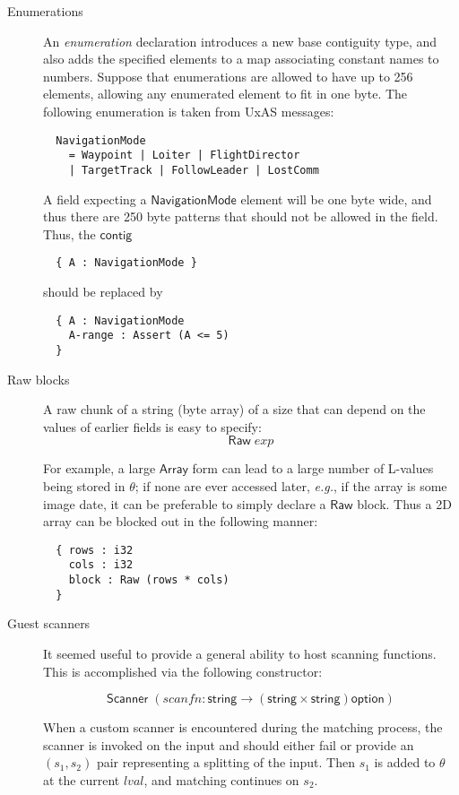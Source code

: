 \documentclass[a4paper,UKenglish,cleveref, autoref, thm-restate]{lipics-v2021}
\newcommand{\eg}{\textit{e.g.}}
\newcommand{\konst}[1]{\ensuremath{\mathsf{#1}}}
\newcommand{\lval}{\ensuremath{\mathit{lval}}}
\begin{document}
\begin{description}

\item [Enumerations] An \emph{enumeration} declaration
introduces a new base contiguity type, and also adds the specified
elements to a map associating constant names to numbers.
Suppose that enumerations are allowed to have up to 256 elements,
allowing any enumerated element to fit in one byte. The following
enumeration is taken from UxAS messages:
{\small
\begin{verbatim}
  NavigationMode
    = Waypoint | Loiter | FlightDirector
    | TargetTrack | FollowLeader | LostComm
\end{verbatim}
}
A field expecting a \konst{NavigationMode} element will be one byte wide,
and thus there are 250 byte patterns that should not be allowed in the
field. Thus, the \konst{contig}

{\small\begin{verbatim}
  { A : NavigationMode }
\end{verbatim}
}
should be replaced by

{\small
\begin{verbatim}
  { A : NavigationMode
    A-range : Assert (A <= 5)
  }
\end{verbatim}
}

\item [Raw blocks] A raw chunk of a string (byte array) of a size that
  can depend on the values of earlier fields is easy to specify:
  \[ \konst{Raw}\; \mathit{exp} \]

For example, a large \konst{Array} form can lead to a large number of
L-values being stored in $\theta$; if none are ever accessed later,
\eg, if the array is some image date, it can be preferable to simply
declare a \konst{Raw} block. Thus a 2D array can be blocked out in the
following manner:

{\small
\begin{verbatim}
  { rows : i32
    cols : i32
    block : Raw (rows * cols)
  }
\end{verbatim}
}

\item [Guest scanners] It seemed useful to provide a general ability
  to host scanning functions. This is accomplished via the following
  constructor:

  \[ \konst{Scanner}\;
     (\mathit{scanfn} : \konst{string} \to (\konst{string} \times \konst{string})\konst{option}) \]

  When a custom scanner is encountered during the matching process,
  the scanner is invoked on the input and should either fail or
  provide an $(s_1,s_2)$ pair representing a splitting of the
  input. Then $s_1$ is added to $\theta$ at the current \lval, and
  matching continues on $s_2$.


\end{description}
\end{document}
